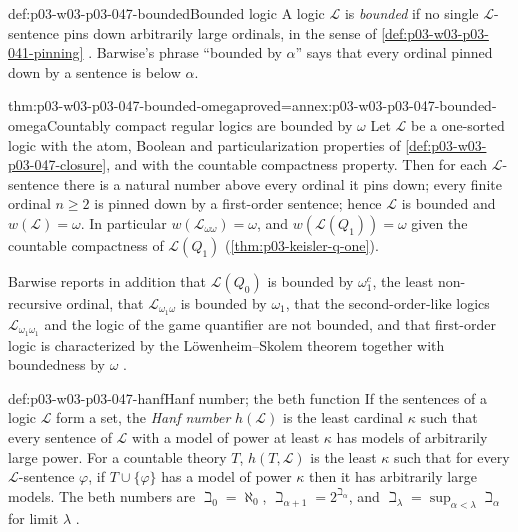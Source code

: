 \begin{hbdefinition}{def:p03-w03-p03-047-bounded}{Bounded logic}
A logic \(\mathscr L\) is \emph{bounded} if no single \(\mathscr L\)-sentence
pins down arbitrarily large ordinals, in the sense of
\cref{def:p03-w03-p03-041-pinning}
\cite[Ch.~II, Definition~5.2.1, p.~61]{Ebbinghaus1985ExtendedLogics}.
Barwise's phrase ``bounded by \(\alpha\)'' says that every ordinal pinned
down by a sentence is below \(\alpha\).
\end{hbdefinition}

\begin{hbtheorem}{thm:p03-w03-p03-047-bounded-omega}{proved=annex:p03-w03-p03-047-bounded-omega}{Countably compact regular logics are bounded by \(\omega\)}
Let \(\mathscr L\) be a one-sorted logic with the atom, Boolean and
particularization properties of \cref{def:p03-w03-p03-047-closure}, and with
the countable compactness property.  Then for each \(\mathscr L\)-sentence
there is a natural number above every ordinal it pins down; every finite
ordinal \(n\ge 2\) is pinned down by a first-order sentence; hence
\(\mathscr L\) is bounded and \(w(\mathscr L)=\omega\).  In particular
\(w(\mathscr L_{\omega\omega})=\omega\), and \(w(\mathscr L(Q_1))=\omega\)
given the countable compactness of \(\mathscr L(Q_1)\)
(\cref{thm:p03-keisler-q-one}).
\end{hbtheorem}

Barwise reports in addition that \(\mathscr L(Q_0)\) is bounded by
\(\omega_1^{c}\), the least non-recursive ordinal, that
\(\mathscr L_{\omega_1\omega}\) is bounded by \(\omega_1\), that the
second-order-like logics \(\mathscr L_{\omega_1\omega_1}\) and the logic of the
game quantifier are not bounded, and that first-order logic is
characterized by the L\"owenheim--Skolem theorem together with boundedness by
\(\omega\) \cite[Ch.~I, \S2.5, p.~18]{Barwise1985BackgroundAims}.

\begin{hbdefinition}{def:p03-w03-p03-047-hanf}{Hanf number; the beth function}
If the sentences of a logic \(\mathscr L\) form a set, the \emph{Hanf
number} \(h(\mathscr L)\) is the least cardinal \(\kappa\) such that every
sentence of \(\mathscr L\) with a model of power at least \(\kappa\) has
models of arbitrarily large power.  For a countable theory \(T\),
\(h(T,\mathscr L)\) is the least \(\kappa\) such that for every
\(\mathscr L\)-sentence \(\varphi\), if \(T\cup\{\varphi\}\) has a model of
power \(\kappa\) then it has arbitrarily large models.  The beth numbers are
\(\beth_0=\aleph_0\), \(\beth_{\alpha+1}=2^{\beth_\alpha}\), and
\(\beth_\lambda=\sup_{\alpha<\lambda}\beth_\alpha\) for limit \(\lambda\)
\cite[Ch.~I, \S2.6, pp.~19--20]{Barwise1985BackgroundAims}.
\end{hbdefinition}

